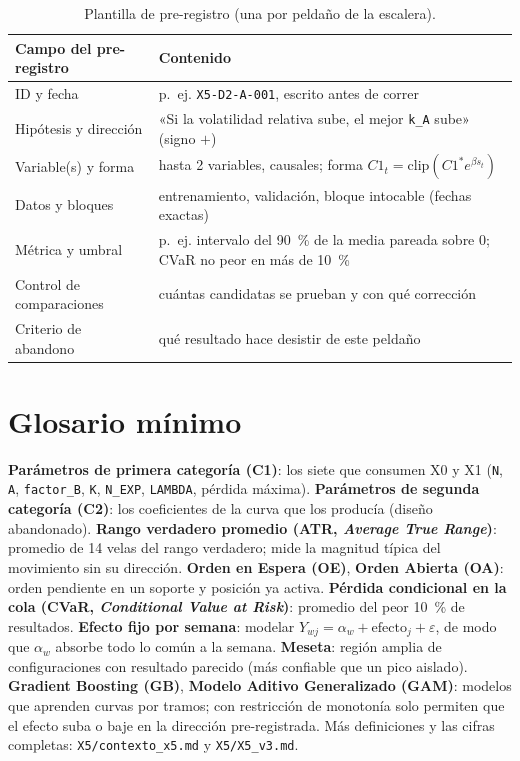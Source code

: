 \documentclass[11pt,a4paper]{article}
\newcommand{\code}[1]{\texttt{\small #1}}
\begin{document}
\begin{table}[H]
\centering\footnotesize
\begin{tabularx}{\linewidth}{lX}
\toprule
Campo del pre-registro & Contenido \\
\midrule
ID y fecha & p.~ej. \code{X5-D2-A-001}, escrito antes de correr \\
Hipótesis y dirección & «Si la volatilidad relativa sube, el mejor \code{k\_A} sube» (signo $+$) \\
Variable(s) y forma & hasta 2 variables, causales; forma $C1_t=\mathrm{clip}(C1^{*}e^{\beta s_t})$ \\
Datos y bloques & entrenamiento, validación, bloque intocable (fechas exactas) \\
Métrica y umbral & p.~ej. intervalo del 90~\% de la media pareada sobre 0; CVaR no peor en más de 10~\% \\
Control de comparaciones & cuántas candidatas se prueban y con qué corrección \\
Criterio de abandono & qué resultado hace desistir de este peldaño \\
\bottomrule
\end{tabularx}
\caption{Plantilla de pre-registro (una por peldaño de la escalera).}
\end{table}

\section{Glosario mínimo}
\textbf{Parámetros de primera categoría (C1)}: los siete que consumen X0 y X1 (\code{N}, \code{A}, \code{factor\_B}, \code{K},
\code{N\_EXP}, \code{LAMBDA}, pérdida máxima). \textbf{Parámetros de segunda categoría (C2)}: los coeficientes de la curva que los producía (diseño abandonado).
\textbf{Rango verdadero promedio (ATR, \emph{Average True Range})}: promedio de 14 velas del rango verdadero; mide la magnitud
típica del movimiento sin su dirección. \textbf{Orden en Espera (OE)}, \textbf{Orden Abierta (OA)}: orden pendiente en un soporte y
posición ya activa. \textbf{Pérdida condicional en la cola (CVaR, \emph{Conditional Value at Risk})}: promedio del peor 10~\% de resultados.
\textbf{Efecto fijo por semana}: modelar $Y_{wj}=\alpha_w+\text{efecto}_j+\varepsilon$, de modo que $\alpha_w$ absorbe todo lo común a la semana.
\textbf{Meseta}: región amplia de configuraciones con resultado parecido (más confiable que un pico aislado).
\textbf{Gradient Boosting (GB)}, \textbf{Modelo Aditivo Generalizado (GAM)}: modelos que aprenden curvas por tramos; con restricción de monotonía
solo permiten que el efecto suba o baje en la dirección pre-registrada. Más definiciones y las cifras completas: \code{X5/contexto\_x5.md} y \code{X5/X5\_v3.md}.
\end{document}
